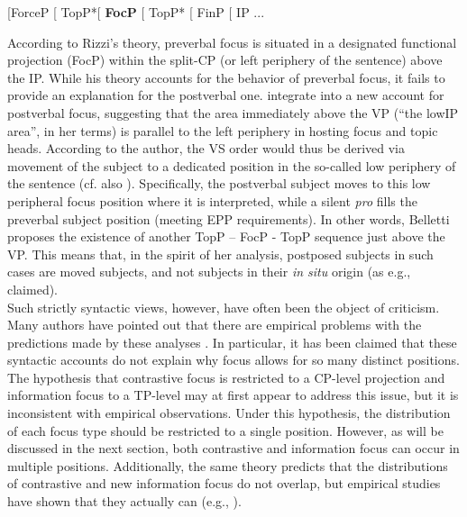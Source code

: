 \begin{description}
\ea{}
[ForceP [ TopP*[ \textbf{FocP} [ TopP* [ FinP [ IP ...
\z

According to Rizzi’s theory, preverbal focus is situated in a designated functional projection (FocP) within the split-CP (or left periphery of the sentence) above the IP. While his theory accounts for the behavior of preverbal focus, it fails to provide an explanation for the postverbal one. \textcite{belletti2001inversion, belletti2004aspects, belletti2008cp, belletti2008answering} integrate \textcite{rizzi1997fine} into a new account for postverbal focus, suggesting that  the  area  immediately  above  the  VP  (``the  lowIP area”, in her terms) is parallel to the left periphery in hosting focus and topic heads. According to the author, 
the VS order would thus be derived via movement of the subject to a dedicated position in the so-called low periphery of the sentence (cf.  also \cite{cardinaletti2004toward}).
Specifically, the postverbal subject moves to this low peripheral focus position where it is interpreted, while a silent \textit{pro} fills the preverbal subject position (meeting EPP requirements). In other words, Belletti proposes the existence of another TopP – FocP - TopP sequence just above the VP. This means that, in the spirit of her analysis, postposed subjects in such cases are moved subjects, and not subjects in their \textit{in situ} origin (as e.g., \cite{burzio1986italian} claimed).\\
Such strictly syntactic views, however, have often been the object of criticism. Many authors have pointed out that there are empirical problems with the predictions made by these analyses \parencite{samek2009topic}. In particular, it has been claimed that these syntactic accounts do not explain why focus allows for so many distinct positions. The hypothesis that contrastive focus is restricted to a CP-level projection and information focus to a TP-level \parencite{belletti2004aspects} may at first appear to address this issue, but it is inconsistent with empirical observations. Under this  hypothesis, the  distribution  of  each  focus type  should  be restricted to a single position. However, as will be discussed in the next section, both contrastive and information focus can occur in multiple positions. Additionally, the same theory predicts that the distributions of contrastive and new information focus do not overlap, but empirical studies have shown that they actually can (e.g., \cite{brunetti2009italian}).\\

\item[3. \textbf{Pragmatic reasons}]


\end{description}
